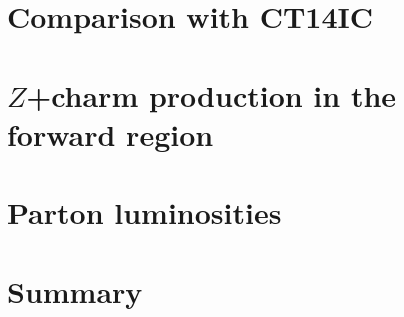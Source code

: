 \section{Comparison with  CT14IC}
\label{sec:ic/ct}


\section{$Z$+charm production in the forward region}
\label{sec:ic/zcharm}


\section{Parton luminosities}
\label{sec:ic/lumis}


\section{Summary}
\label{sec:ic/summary}

